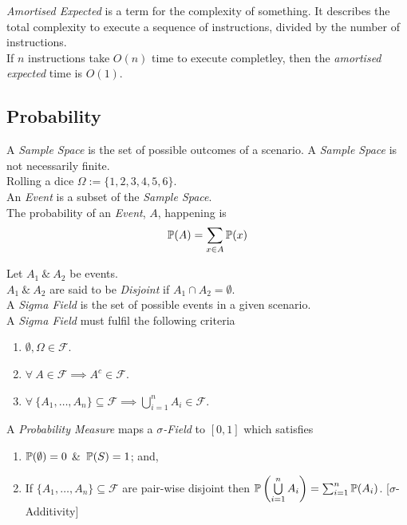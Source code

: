 \documentclass[11pt,a4paper]{article}
\begin{document}
\textit{Amortised Expected} is a term for the complexity of something. It describes the total complexity to execute a sequence of instructions, divided by the number of instructions.\\
\eg If $n$ instructions take $O(n)$ time to execute completley, then the \textit{amortised expected} time is $O(1)$.

\subsection{Probability}

A \textit{Sample Space} is the set of possible outcomes of a scenario. A \textit{Sample Space} is not necessarily finite.\\
\eg Rolling a dice $\Omega:=\{1,2,3,4,5,6\}$.\\

An \textit{Event} is a subset of the \textit{Sample Space}.\\
The probability of an \textit{Event}, $A$, happening is
$$\mathbb{P}(A)=\sum_{x\in A}\mathbb{P}(x)$$

Let $A_1\ \&\ A_2$ be events.\\
$A_1\ \&\ A_2$ are said to be \textit{Disjoint} if $A_1\cap A_2=\emptyset$.\\

A \textit{Sigma Field} is the set of possible events in a given scenario.\\
A \textit{Sigma Field} must fulfil the following criteria
\begin{enumerate}
	\item $\emptyset,\Omega\in\mathcal{F}$.
	\item $\forall\ A\in\mathcal{F}\implies A^c\in\mathcal{F}$.
	\item $\forall\ \{A_1,\dots,A_n\}\subseteq\mathcal{F}\implies\bigcup\limits_{i=1}^nA_i\in\mathcal{F}$.
\end{enumerate}

A \textit{Probability Measure} maps a \textit{$\sigma$-Field} to $[0,1]$ which satisfies
\begin{enumerate}
	\item $\mathbb{P}(\emptyset)=0$ \&\ $\mathbb{P}(S)=1$; and,
	\item If $\{A_1,\dots,A_n\}\subseteq\mathcal{F}$ are pair-wise disjoint then $\mathbb{P}\left(\bigcup\limits_{i=1}^nA_i\right)=\sum_{i=1}^n\mathbb{P}(A_i)$. [$\sigma$-Additivity]
\end{enumerate}
\end{document}
